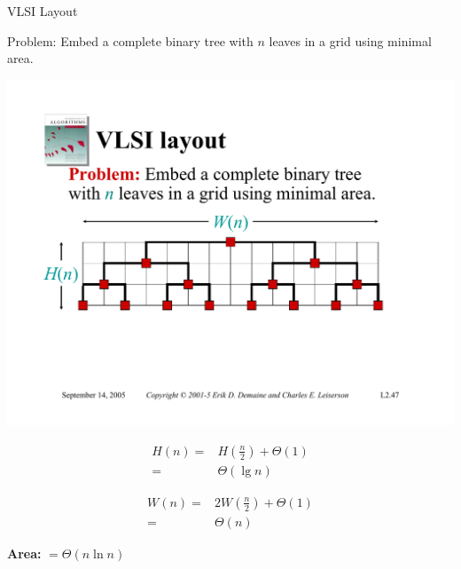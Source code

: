\documentclass{beamer}
\begin{document}
\begin{frame}{VLSI Layout}
    \begin{exampleblock}{Problem:}
        Embed a complete binary tree with $n$ leaves in a grid using minimal area.
    \end{exampleblock}
    \pause
    \centering
    \includegraphics[width=\textwidth, trim={1cm 5cm 2cm 7cm}, clip]{pages/lec3_47}
    \begin{minipage}{0.48\textwidth}
        \pause
        \begin{equation*}
            \begin{split}
                H(n) =& H\left(\frac{n}{2}\right) + \Theta(1) \\
                    =& \Theta(\lg n)
            \end{split}
        \end{equation*}
    \end{minipage}
    \hfill
    \begin{minipage}{0.48\textwidth}
        \pause
        \begin{equation*}
            \begin{split}
                W(n) =& 2W\left(\frac{n}{2}\right) + \Theta(1) \\
                    =& \Theta(n)
            \end{split}
        \end{equation*}
    \end{minipage}
    \pause
    \begin{exampleblock}{ }
        \centering
        \Large
        \textbf{Area:} $ = \Theta(n \ln n)$
    \end{exampleblock}
\end{frame}
\end{document}
